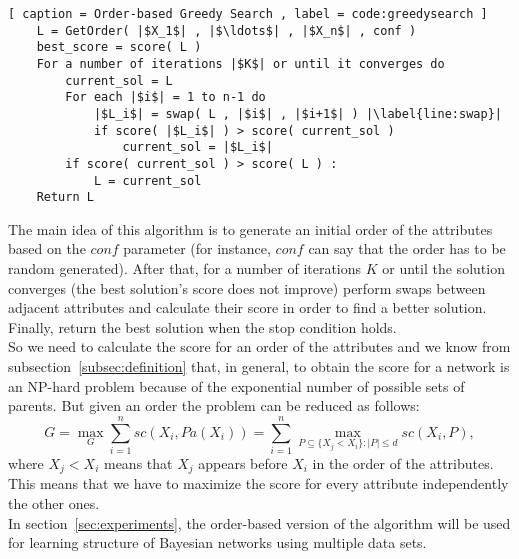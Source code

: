 \begin{lstlisting}[ caption = Order-based Greedy Search , label = code:greedysearch ]
	L = GetOrder( |$X_1$| , |$\ldots$| , |$X_n$| , conf )
	best_score = score( L )
	For a number of iterations |$K$| or until it converges do
		current_sol = L
		For each |$i$| = 1 to n-1 do
			|$L_i$| = swap( L , |$i$| , |$i+1$| ) |\label{line:swap}|
			if score( |$L_i$| ) > score( current_sol )
				current_sol = |$L_i$|
		if score( current_sol ) > score( L ) :
			L = current_sol
	Return L
\end{lstlisting}
The main idea of this algorithm is to generate an initial order of the attributes based on the ${conf}$ parameter (for instance, ${conf}$ can say that the order has to be random generated). After that, for a number of iterations $K$ or until the solution converges (the best solution's score does not improve) perform swaps between adjacent attributes and calculate their score in order to find a better solution. Finally, return the best solution when the stop condition holds.\\
So we need to calculate the score for an order of the attributes and we know from subsection~\ref{subsec:definition} that, in general, to obtain the score for a network is an NP-hard problem because of the exponential number of possible sets of parents. But given an order the problem can be reduced as follows:
	\[ G = \max_G \sum_{i=1}^{n} {sc}( X_i , {Pa}( X_i ) ) = \sum_{i=1}^{n} \max_{P \subseteq \{ X_j < X_i \}:|P|\leq d} {sc}( X_i , P ) ,\]
where $X_j < X_i$ means that $X_j$ appears before $X_i$ in the order of the attributes. This means that we have to maximize the score for every attribute independently the other ones.\\
In section~\ref{sec:experiments}, the order-based version of the algorithm will be used for learning structure of Bayesian networks using multiple data sets.